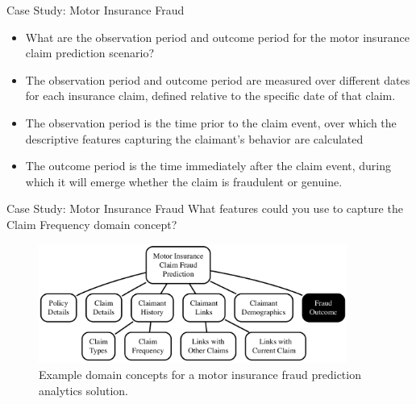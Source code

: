 \documentclass[xcolor={table}]{beamer}
\begin{document}
\begin{frame}
\begin{block}{Case Study: Motor Insurance Fraud}
\begin{itemize}
\item <1-4> What are the observation period and outcome period for the motor insurance claim prediction scenario? 
\item <2-4> The observation period and outcome period are measured over different dates for each insurance claim, defined relative to the specific date of that claim.
\item <3-4> The observation period is the time prior to the claim event, over which the descriptive features capturing the claimant's behavior are calculated
\item <4> The outcome period is the time immediately after the claim event, during which it will emerge whether the claim is fraudulent or genuine.
\end{itemize}
\end{block}
\end{frame}

 \begin{frame} [plain]
 \begin{block}{Case Study: Motor Insurance Fraud}
What features could you use to capture the Claim Frequency domain concept?
\begin{figure}[htb]
	\begin{center}
			\includegraphics[width=0.9\textwidth]{./images/motorInsurance1.pdf}
	\end{center}
	\caption{Example domain concepts for a motor insurance fraud prediction analytics solution.}
	\label{fig:DataMetrics3}
\end{figure}
\end{block}
\end{frame} 
\end{document}
